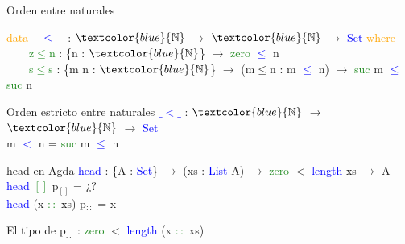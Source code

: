 \documentclass[xcolor=dvipsnames]{beamer} %
\newcommand{\cf}[1]{\textcolor{blue}{#1}}
\newcommand{\ct}[1]{\textcolor{blue}{#1}}
\newcommand{\cc}[1]{\textcolor{ForestGreen}{#1}}
\newcommand{\ck}[1]{\textcolor{orange}{#1}}
\newcommand{\N}{\ct{\mathbb{N}}}
\newcommand{\ra}{\rightarrow}
\begin{document}
\begin{frame}

\begin{block}{Orden entre naturales}

\ck{data} \ct{\_$\leq$\_} : $\N$ $\ra$ $\N$ $\ra$ \ct{Set} \ck{where}\\
\ \ \ \ \cc{z$\leq$n} : \{n : $\N$\}                 $\ra$ \cc{zero}  \ct{$\leq$} n\\
\ \ \ \ \cc{s$\leq$s} : \{m n : $\N$\} $\ra$ (m$\leq$n : m \ct{$\leq$} n) $\ra$ \cc{suc} m \ct{$\leq$} \cc{suc} n

\end{block}

\begin{block}{Orden estricto entre naturales}
\cf{$\_<\_$} : $\N$ $\ra$ $\N$ $\ra$ \ct{Set}\\
m \cf{$<$} n = \cc{suc} m \cf{$\leq$} n
\end{block}

\begin{block}{head en Agda}
    \cf{head} : \{A : \ct{Set}\}  $\ra$ (xs : \ct{List} A) $\ra$ 
    \cc{zero} $<$ \ct{length} xs $\rightarrow$ A \\
    \cf{head} \cc{$[]$} p$_{[]}$ = ¿?\\
    \cf{head} (x \cc{$::$} xs) p$_{::}$ = x
  \end{block}  

\begin{block}{}
El tipo de p$_{::}$ : \cc{zero} $<$ \ct{length} (x \cc{$::$} xs)
\end{block}

\end{frame}
\end{document}
